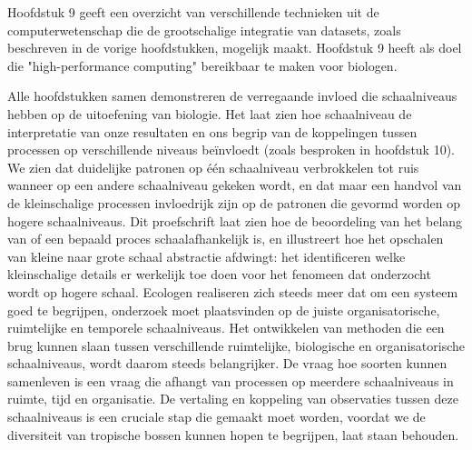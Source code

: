 \documentclass[b5paper,justified]{tufte-book} %
\begin{document}
\begin{fullwidth}
Hoofdstuk 9 geeft een overzicht van verschillende technieken uit de computerwetenschap die de grootschalige integratie van datasets, zoals beschreven in de vorige hoofdstukken, mogelijk maakt. Hoofdstuk 9 heeft als doel die "high-performance computing" bereikbaar te maken voor biologen.

Alle hoofdstukken samen demonstreren de verregaande invloed die schaalniveaus hebben op de uitoefening van biologie. Het laat zien hoe schaalniveau de interpretatie van onze resultaten en ons begrip van de koppelingen tussen processen op verschillende niveaus be\"invloedt (zoals besproken in hoofdstuk 10). We zien dat duidelijke patronen op \'e\'en schaalniveau verbrokkelen tot ruis wanneer op een andere schaalniveau gekeken wordt, en dat maar een handvol van de kleinschalige processen invloedrijk zijn op de patronen die gevormd worden op hogere schaalniveaus. Dit proefschrift laat zien hoe de beoordeling van het belang van of een bepaald proces schaalafhankelijk is, en illustreert hoe het opschalen van kleine naar grote schaal abstractie afdwingt: het identificeren welke kleinschalige details er werkelijk toe doen voor het fenomeen dat onderzocht wordt op hogere schaal. Ecologen realiseren zich steeds meer dat om een systeem goed te begrijpen, onderzoek moet plaatsvinden op de juiste organisatorische, ruimtelijke en temporele schaalniveaus. Het ontwikkelen van methoden die een brug kunnen slaan tussen verschillende ruimtelijke, biologische en organisatorische schaalniveaus, wordt daarom steeds belangrijker. De vraag hoe soorten kunnen samenleven is een vraag die afhangt van processen op meerdere schaalniveaus in ruimte, tijd en organisatie. De vertaling en koppeling van observaties tussen deze schaalniveaus is een cruciale stap die gemaakt moet worden, voordat we de diversiteit van tropische bossen kunnen hopen te begrijpen, laat staan behouden. 




\end{fullwidth}
\end{document}
